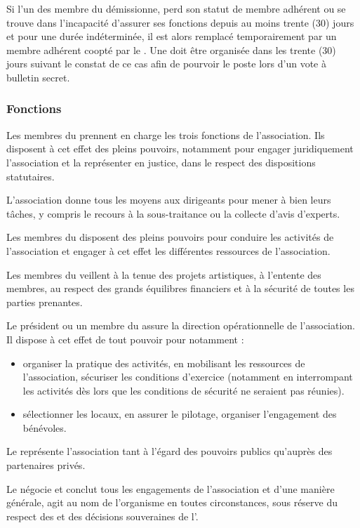 \documentclass[a4paper,french,10pt]{article}
\begin{document}
Si l'un des membre du \bureau{} démissionne, perd son statut de membre adhérent ou se trouve dans l'incapacité d'assurer ses fonctions depuis au moins trente (30) jours et pour une durée indéterminée, il est alors remplacé temporairement par un membre adhérent coopté par le \bureau{}. Une \AGE{} doit être organisée dans les trente (30) jours suivant le constat de ce cas afin de pourvoir le poste lors d'un vote à bulletin secret.

\subsubsection*{Fonctions}
\label{sec:fonctions}

Les membres du \bureau{} prennent en charge les trois fonctions de
l’association.  Ils disposent à cet effet des pleins pouvoirs,
notamment pour engager juridiquement l’association et la représenter
en justice, dans le respect des dispositions statutaires.

L’association donne tous les moyens aux dirigeants pour mener à bien
leurs tâches, y compris le recours à la sous-traitance ou la collecte
d’avis d’experts.

Les membres du \bureau{} disposent des pleins pouvoirs pour conduire les
activités de l’association et engager à cet effet les différentes
ressources de l’association.

Les membres du \bureau{} veillent à la tenue des projets artistiques, à
l'entente des membres, au respect des grands équilibres financiers
et à la sécurité de toutes les parties prenantes. 


Le président ou un membre du \bureau{} assure la direction opérationnelle de
l’association. Il dispose à cet effet de tout pouvoir pour notamment :
\begin{itemize}
\item organiser la pratique des activités, en mobilisant les ressources de l’association, sécuriser les conditions d’exercice (notamment en interrompant les activités dès lors que les conditions de sécurité ne seraient pas réunies).
\item sélectionner les locaux, en assurer le pilotage, organiser l’engagement des bénévoles.
\end{itemize}

Le \bureau{} représente l’association tant à l’égard des pouvoirs publics qu’auprès des partenaires privés.

Le \bureau{} négocie et conclut tous les engagements de l’association et d’une manière générale, agit au nom de l’organisme en toutes circonstances, sous réserve du respect des \statuts{} et des décisions souveraines de l’\AG{}.
\end{document}
